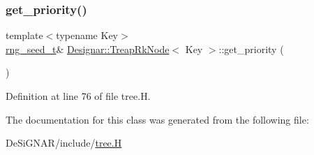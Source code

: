 \subsubsection{\texorpdfstring{get\+\_\+priority()}{get\_priority()}}
{\footnotesize\ttfamily template$<$typename Key$>$ \\
\hyperlink{namespace_designar_ad621b5646d45288c5d6a1e1dfe7531a8}{rng\+\_\+seed\+\_\+t}\& \hyperlink{class_designar_1_1_treap_rk_node}{Designar\+::\+Treap\+Rk\+Node}$<$ Key $>$\+::get\+\_\+priority (\begin{DoxyParamCaption}{ }\end{DoxyParamCaption})\hspace{0.3cm}{\ttfamily [inline]}}



Definition at line 76 of file tree.\+H.



The documentation for this class was generated from the following file\+:\begin{DoxyCompactItemize}
\item 
De\+Si\+G\+N\+A\+R/include/\hyperlink{tree_8_h}{tree.\+H}\end{DoxyCompactItemize}
